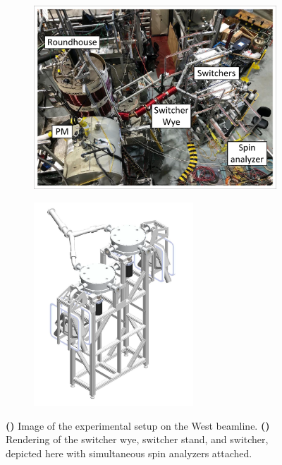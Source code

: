\begin{figure}
\centering
\begin{subfigure}{.5\textwidth}
  \centering
  \includegraphics[width=\textwidth]{figures/2021_west_beamline_image.pdf}
  \vspace{5pt}
  \caption{}\label{subfig:west_beamline_switchers}
\end{subfigure}%
\begin{subfigure}{.5\textwidth}
  \centering
  \includegraphics[height=3in]{figures/switcher_mockup.png}
  \caption{}\label{subfig:switcher_mockup}
\end{subfigure}
\caption
{\textbf{()} Image of the experimental setup on the West beamline. \textbf{()} Rendering of the switcher wye, switcher stand, and switcher, depicted here with simultaneous spin analyzers attached.}
\label{fig:west_beamline_switchers}
\end{figure}

